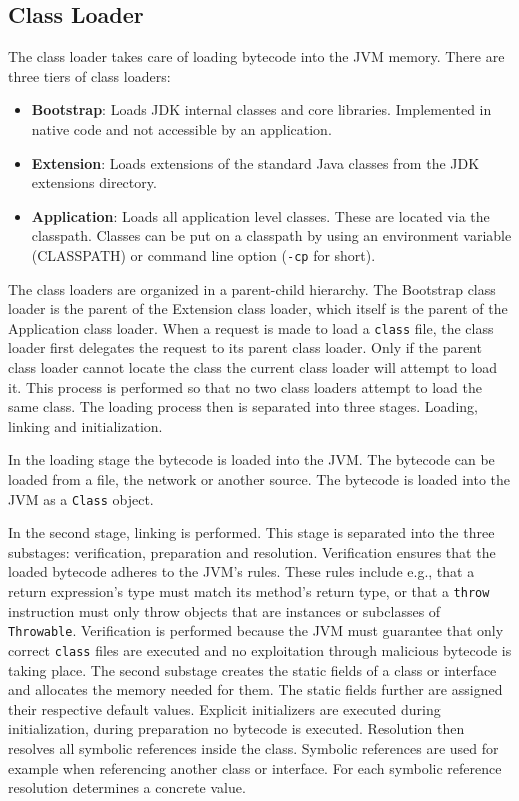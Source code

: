 \subsection{Class Loader}

The class loader takes care of loading bytecode into the JVM memory. There are three tiers of class loaders:

\begin{itemize}
    \item \textbf{Bootstrap}: Loads JDK internal classes and core libraries. Implemented in native code and not accessible by an application. 
    \item \textbf{Extension}: Loads extensions of the standard Java classes from the JDK extensions directory. 
    \item \textbf{Application}: Loads all application level classes. These are located via the classpath. Classes can be put on a classpath by using an environment variable (CLASSPATH) or command line option (\verb|-cp| for short). 
\end{itemize}

The class loaders are organized in a parent-child hierarchy. The Bootstrap class loader is the parent of the Extension class loader, which itself is the parent of the Application class loader. When a request is made to load a \texttt{class} file, the class loader first delegates the request to its parent class loader. Only if the parent class loader cannot locate the class the current class loader will attempt to load it. This process is performed so that no two class loaders attempt to load the same class. The loading process then is separated into three stages. Loading, linking and initialization.

In the loading stage the bytecode is loaded into the JVM. The bytecode can be loaded from a file, the network or another source. The bytecode is loaded into the JVM as a \texttt{Class} object.

In the second stage, linking is performed. This stage is separated into the three substages: verification, preparation and resolution. Verification ensures that the loaded bytecode adheres to the JVM's rules. These rules include e.g., that a return expression's type must match its method's return type, or that a \texttt{throw} instruction must only throw objects that are instances or subclasses of \texttt{Throwable}. Verification is performed because the JVM must guarantee that only correct \texttt{class} files are executed and no exploitation through malicious bytecode is taking place. The second substage creates the static fields of a class or interface and allocates the memory needed for them. The static fields further are assigned their respective default values. Explicit initializers are executed during initialization, during preparation no bytecode is executed. Resolution then resolves all symbolic references inside the class. Symbolic references are used for example when referencing another class or interface. For each symbolic reference resolution determines a concrete value. 

